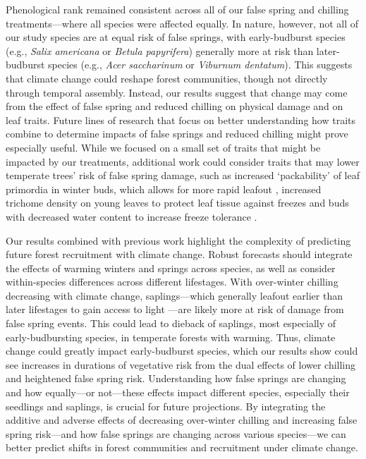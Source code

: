\documentclass{article}\usepackage[]{graphicx}\usepackage[]{color}
\begin{document}
Phenological rank remained consistent across all of our false spring and chilling treatments---where all species were affected equally. In nature, however, not all of our study species are at equal risk of false springs, with early-budburst species (e.g., \textit{Salix americana} or \textit{Betula papyrifera}) generally more at risk than later-budburst species (e.g., \textit{Acer saccharinum} or \textit{Viburnum dentatum}). This suggests that climate change could reshape forest communities, though not directly through temporal assembly. Instead, our results suggest that change may come from the effect of false spring and reduced chilling on physical damage and on leaf traits. Future lines of research that focus on better understanding how traits combine to determine impacts of false springs and reduced chilling might prove especially useful. While we focused on a small set of traits that might be impacted by our treatments, additional work could consider traits that may lower temperate trees' risk of false spring damage, such as increased `packability' of leaf primordia in winter buds, which allows for more rapid leafout \citep{Edwards2017}, increased trichome density on young leaves to protect leaf tissue against freezes \citep{Agrawal2004, Prozherina2003} and buds with decreased water content to increase freeze tolerance \citep{Beck2007, Hofmann2015, Kathke2011, Morin2007,  Muffler2016, Nielsen2009, Poirier2010}. %

Our results combined with previous work highlight the complexity of predicting future forest recruitment with climate change. Robust forecasts should integrate the effects of warming winters and springs across species, as well as consider within-species differences across different lifestages. With over-winter chilling decreasing with climate change, saplings---which generally leafout earlier than later lifestages to gain access to light \citep{Augspurger2009}---are likely more at risk of damage from false spring events. This could lead to dieback of saplings, most especially of early-budbursting species, in temperate forests with warming. Thus, climate change could greatly impact early-budburst species, which our results show could see increases in durations of vegetative risk from the dual effects of lower chilling and heightened false spring risk. Understanding how false springs are changing and how equally---or not---these effects impact different species, especially their seedlings and saplings, is crucial for future projections. By integrating the additive and adverse effects of decreasing over-winter chilling and increasing false spring risk---and how false springs are changing across various species---we can better predict shifts in forest communities and recruitment under climate change. 
\end{document}
